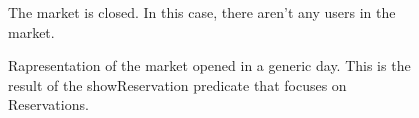 \begin{figure}[H]

  \centering
   \caption{The market is closed. In this case, there aren't any users in the market.}
  \label{marketClosed}

   
\end{figure}

\begin{figure}[H]
  
  \centering
   \caption{Rapresentation of the market opened in a generic day. This is the result of the showReservation predicate that focuses on Reservations.} 
     \label{shorReserv}

\end{figure}

